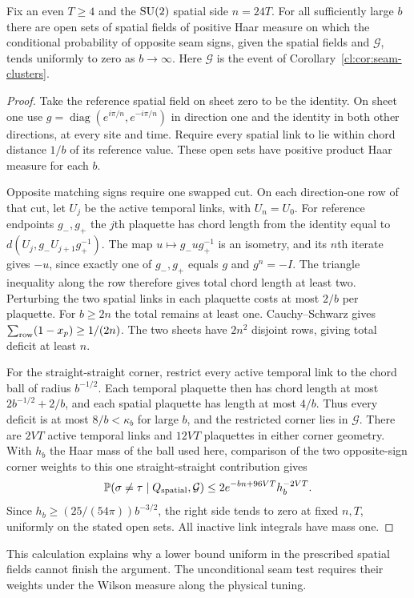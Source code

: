 \begin{proposition}
\label{cl:prop:seam-winding}
Fix an even $T\ge4$ and the $\mathrm{SU}(2)$ spatial side $n=24T$. For all
sufficiently large $b$ there are open sets of spatial fields of positive
Haar measure on which the conditional probability of opposite seam signs,
given the spatial fields and $\mathcal G$, tends uniformly to zero as
$b\to\infty$. Here $\mathcal G$ is the event of Corollary~\ref{cl:cor:seam-clusters}.
\end{proposition}
\begin{proof}
Take the reference spatial field on sheet zero to be the identity.
On sheet one use $g=\operatorname{diag}(e^{i\pi/n},e^{-i\pi/n})$
in direction one and the identity in both other directions, at every
site and time. Require every spatial link to lie within chord distance
$1/b$ of its reference value. These open sets have positive product Haar
measure for each $b$.

Opposite matching signs require one swapped cut. On each direction-one
row of that cut, let $U_j$ be the active temporal links, with $U_n=U_0$.
For reference endpoints $g_-,g_+$ the $j$th plaquette has chord length
from the identity equal to $d(U_j,g_-U_{j+1}g_+^{-1})$. The map
$u\mapsto g_-u g_+^{-1}$ is an isometry, and its $n$th iterate gives
$-u$, since exactly one of $g_-,g_+$ equals $g$ and $g^n=-I$.
The triangle inequality along the row therefore gives total chord length
at least two. Perturbing the two spatial links in each plaquette costs
at most $2/b$ per plaquette. For $b\ge2n$ the total remains at least one.
Cauchy--Schwarz gives $\sum_{\rm row}(1-x_p)\ge1/(2n)$. The two sheets
have $2n^2$ disjoint rows, giving total deficit at least $n$.

For the straight-straight corner, restrict every active temporal link to
the chord ball of radius $b^{-1/2}$. Each temporal plaquette then has
chord length at most $2b^{-1/2}+2/b$, and each spatial plaquette has
length at most $4/b$. Thus every deficit is at most $8/b<\kappa_b$ for
large $b$, and the restricted corner lies in $\mathcal G$.
There are $2VT$ active temporal links and $12VT$ plaquettes in either
corner geometry. With $h_b$ the Haar mass of the ball used here,
comparison of the two opposite-sign corner weights to this one
straight-straight contribution gives
\[
 {\mathbb P}(\sigma\ne\tau\mid Q_{\rm spatial},\mathcal G)
 \le 2e^{-bn+96VT}h_b^{-2VT}.
\]
Since $h_b\ge(25/(54\pi))b^{-3/2}$, the right side tends to zero at
fixed $n,T$, uniformly on the stated open sets. All inactive link
integrals have mass one.
\end{proof}
This calculation explains why a lower bound uniform in the prescribed
spatial fields cannot finish the argument. The unconditional seam test
requires their weights under the Wilson measure along the physical tuning.

